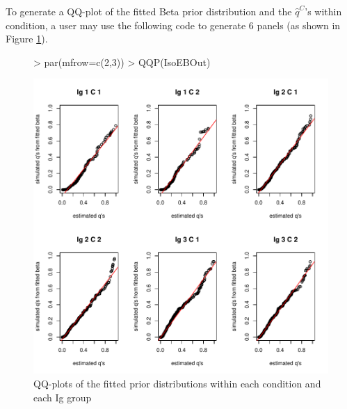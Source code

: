 \documentclass{article}
\begin{document}
\newpage
\noindent To generate a QQ-plot of the fitted Beta prior distribution 
and the $\hat{q}^C$'s within condition, a user may 
use the following code to generate 6 panels (as shown in Figure \ref{fig:IsoQQ}).
\begin{figure}[h!]
\centering
\begin{Schunk}
\begin{Sinput}
> par(mfrow=c(2,3))
> QQP(IsoEBOut)
\end{Sinput}
\end{Schunk}
\includegraphics{EBSeq_Vignette-034}
\caption{ QQ-plots of the fitted prior distributions within each condition and each Ig group}
\label{fig:IsoQQ}
\end{figure}
\end{document}
